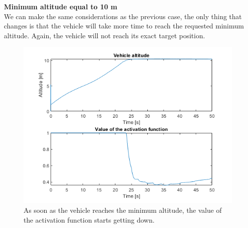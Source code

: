 \documentclass{article}
\begin{document}
{\large \textbf{Minimum altitude equal to 10 m}} \\
We can make the same considerations as the previous case, the only thing that changes is that the vehicle will take more time to reach the requested minimum altitude. Again, the vehicle will not reach its exact target position.

\begin{figure}[H]
	\centering
	\hspace{10mm}
	\label{fig:ex1.2.3_case10m_ab}
\end{figure}
\begin{figure}[H]
	\centering
	\includegraphics[scale=0.55]{images/Ex1/SafeNavigation_10m_AltAndActFunct}
	\caption{As soon as the vehicle reaches the minimum altitude, the value of the activation function starts getting down.}
	\label{fig:ex1.2.3_case10m_c}
\end{figure}
\end{document}
